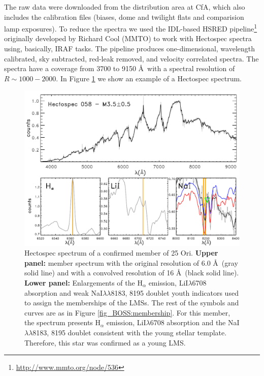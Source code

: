 \documentclass[12pt]{article}
\newcounter{subsubsubsection}[subsubsection]
\begin{document}
\label{sec_Hectospec:targets}
The raw data were downloaded from the distribution area at CfA, which also includes the calibration files (biases, dome and twilight flats and comparision lamp exposures). To reduce the spectra we used the IDL-based HSRED pipeline\footnote{\url{http://www.mmto.org/node/536}} originally developed by Richard Cool (MMTO) to work with Hectospec spectra using, basically, IRAF tasks. The pipeline produces one-dimensional, wavelength calibrated, sky subtracted, red-leak removed, and velocity correlated spectra. The spectra have a coverage from 3700 to 9150 \AA\ with a spectral resolution of $R\sim1000-2000$. In Figure \ref{fig:membership_MMT} we show an example of a Hectospec spectrum.

\begin{figure}%
	\includegraphics[width=1.0\textwidth]{memberships_Hectospec.pdf}
	\caption[Hectospec spectrum of a confirmed member of 25 Ori.]{Hectospec spectrum of a confirmed member of 25 Ori. \textbf {Upper panel:} member spectrum with the original resolution of 6.0 \AA\ (gray solid line) and with a convolved resolution of 16 \AA\ (black solid line). \textbf {Lower panel:} Enlargements of the H$_\alpha$ emission, LiI$\lambda$6708 absorption and weak NaI$\lambda\lambda$8183, 8195 doublet youth indicators used to assign the memberships of the LMSs. The rest of the symbols and curves are as in Figure \ref{fig_BOSS:membership}. For this member, the spectrum presents H$_\alpha$ emission, LiI$\lambda$6708 absorption and the NaI$\lambda\lambda$8183, 8195 doublet consistent with the young stellar template. Therefore, this star was confirmed as a young LMS.}
	\label{fig:membership_MMT}
\end{figure}
\end{document}
